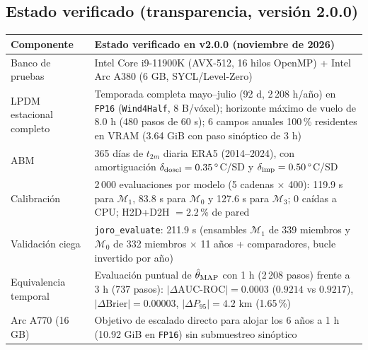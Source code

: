 \documentclass[11pt,letterpaper]{article}
\begin{document}
\subsection{Estado verificado (transparencia, versión 2.0.0)}
\begin{center}\small
\begin{tabularx}{\textwidth}{@{}p{3.6cm}Y@{}}\toprule
Componente & Estado verificado en v2.0.0 (noviembre de 2026)\\\midrule
Banco de pruebas & Intel Core i9-11900K (AVX-512, 16 hilos OpenMP) + Intel Arc A380 (6 GB, SYCL/Level-Zero)\\
LPDM estacional completo & Temporada completa mayo--julio (92 d, 2\,208 h/año) en \texttt{FP16} (\texttt{Wind4Half}, 8 B/vóxel); horizonte máximo de vuelo de 8.0 h (480 pasos de 60 s); 6 campos anuales 100\,\% residentes en VRAM (3.64 GiB con paso sinóptico de 3 h)\\
ABM & 365 días de $t_{2m}$ diaria ERA5 (2014--2024), con amortiguación $\delta_{\rm dosel}=0.35\,^\circ$C/SD y $\delta_{\rm imp}=0.50\,^\circ$C/SD\\
Calibración & 2\,000 evaluaciones por modelo (5 cadenas $\times$ 400): 119.9 s para $\mathcal M_1$, 83.8 s para $\mathcal M_0$ y 127.6 s para $\mathcal M_3$; 0 caídas a CPU; H2D+D2H $=2.2$\,\% de pared\\
Validación ciega & \texttt{joro\_evaluate}: 211.9 s (ensambles $\mathcal M_1$ de 339 miembros y $\mathcal M_0$ de 332 miembros $\times$ 11 años + comparadores, bucle invertido por año)\\
Equivalencia temporal & Evaluación puntual de $\hat\theta_{\rm MAP}$ con 1 h (2\,208 pasos) frente a 3 h (737 pasos): $|\Delta\text{AUC-ROC}|=0.0003$ ($0.9214$ vs $0.9217$), $|\Delta\text{Brier}|=0.00003$, $|\Delta P_{95}|=4.2$ km (1.65\,\%)\\
Arc A770 (16 GB) & Objetivo de escalado directo para alojar los 6 años a 1 h (10.92 GiB en \texttt{FP16}) sin submuestreo sinóptico\\
\bottomrule\end{tabularx}\end{center}
\end{document}
